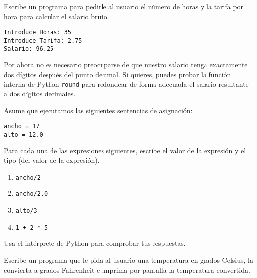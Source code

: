 \begin{ex}
Escribe un programa para pedirle al usuario el número de horas y la tarifa por hora para calcular
el salario bruto.
\begin{verbatim}
Introduce Horas: 35
Introduce Tarifa: 2.75
Salario: 96.25
\end{verbatim}
\end{ex}
%
Por ahora no es necesario preocuparse de que nuestro salario tenga exactamente dos
dígitos después del punto decimal. Si quieres, puedes probar la función interna de Python
{\tt round} para redondear de forma adecuada el salario resultante
a dos dígitos decimales.

\begin{ex}
Asume que ejecutamos las siguientes sentencias de asignación:

\begin{verbatim}
ancho = 17
alto = 12.0
\end{verbatim}

Para cada una de las expresiones siguientes, escribe el valor de la
expresión y el tipo (del valor de la expresión).

\begin{enumerate}

\item {\tt ancho/2}

\item {\tt ancho/2.0}

\item {\tt alto/3}

\item {\tt 1 + 2 * 5}

\end{enumerate}

Usa el intérprete de Python para comprobar tus respuestas.
\end{ex}

\begin{ex}
Escribe un programa que le pida al usuario una temperatura en grados Celsius,
la convierta a grados Fahrenheit e imprima por pantalla
la temperatura convertida.
\end{ex}


